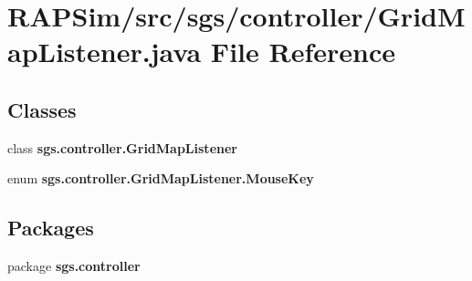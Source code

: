 \section{R\-A\-P\-Sim/src/sgs/controller/\-Grid\-Map\-Listener.java File Reference}
\label{_grid_map_listener_8java}
\subsection*{Classes}
\begin{DoxyCompactItemize}
\item 
class {\bf sgs.\-controller.\-Grid\-Map\-Listener}
\item 
enum {\bfseries sgs.\-controller.\-Grid\-Map\-Listener.\-Mouse\-Key}
\end{DoxyCompactItemize}
\subsection*{Packages}
\begin{DoxyCompactItemize}
\item 
package {\bf sgs.\-controller}
\end{DoxyCompactItemize}
